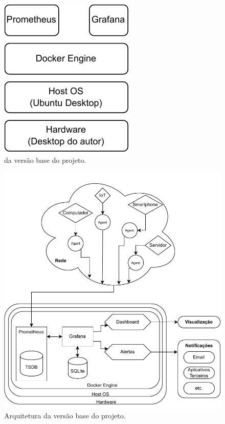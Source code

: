\begin{figure}[H]
\centering
\includegraphics[scale=0.97]{Imagens/chap03/v3_stack.pdf}
\caption{ da versão base do projeto.}
\label{fig:StackBase}
\end{figure}
\begin{figure}[H]
\centering
\includegraphics[scale=0.98]{Imagens/chap03/v3_diagram.pdf}
\caption{Arquitetura da versão base do projeto.}
\label{fig:ArquiteturaBase}
\end{figure}

